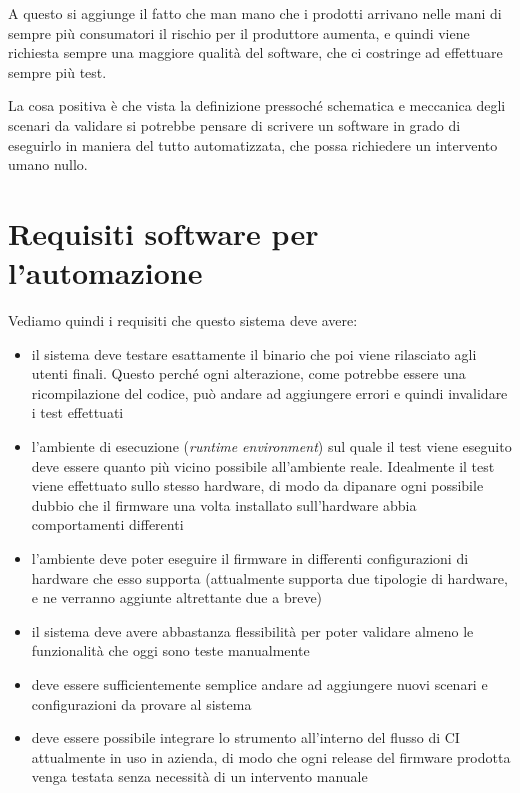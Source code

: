 \documentclass[12pt,a4paper,twoside,titlepage]{book}
\begin{document}
A questo si aggiunge il fatto che man mano che i prodotti arrivano nelle mani di sempre più consumatori 
il rischio per il produttore aumenta, e quindi viene richiesta sempre una maggiore qualità del software, 
che ci costringe ad effettuare sempre più test. 

La cosa positiva è che vista la definizione pressoché schematica e meccanica degli scenari da validare 
si potrebbe pensare di scrivere un software in grado di eseguirlo in maniera del tutto automatizzata, 
che possa richiedere un intervento umano nullo.

\section{Requisiti software per l'automazione}

Vediamo quindi i requisiti che questo sistema deve avere:

\begin{itemize}
    \item il sistema deve testare esattamente il binario che poi viene rilasciato agli utenti finali.
        Questo perché ogni alterazione, come potrebbe essere una ricompilazione del codice, può andare
        ad aggiungere errori e quindi invalidare i test effettuati
    \item l'ambiente di esecuzione (\textit{runtime environment}) sul quale il test viene eseguito deve essere quanto
        più vicino possibile all'ambiente reale. Idealmente il test viene effettuato sullo stesso hardware,
        di modo da dipanare ogni possibile dubbio che il \gls{firmware} una volta installato sull'hardware abbia
        comportamenti differenti
    \item l'ambiente deve poter eseguire il \gls{firmware} in differenti configurazioni di hardware che esso supporta
        (attualmente supporta due tipologie di hardware, e ne verranno aggiunte altrettante due a breve)
    \item il sistema deve avere abbastanza flessibilità per poter validare almeno le funzionalità che oggi
        sono teste manualmente
    \item deve essere sufficientemente semplice andare ad aggiungere nuovi scenari e configurazioni da provare al sistema
    \item deve essere possibile integrare lo strumento all'interno del flusso di CI attualmente in
        uso in azienda, di modo che ogni release del \gls{firmware} prodotta venga testata senza necessità di
        un intervento manuale
\end{itemize}
\end{document}
